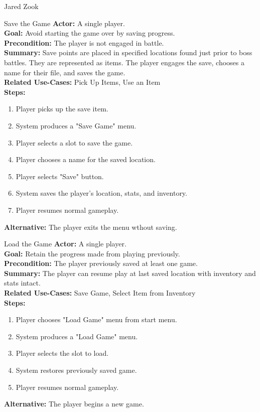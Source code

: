 \documentclass[12pt]{report}
\begin{document}
\begin{section}{Jared Zook}

\begin{subsection}{Save the Game}
\textbf{Actor:} A single player. \\
\textbf{Goal:} Avoid starting the game over by saving progress. \\
\textbf{Precondition:} The player is not engaged in battle. \\
\textbf{Summary:} Save points are placed in specified locations found just prior to boss battles. They are represented as items. The player engages the save, chooses a name for their file, and saves the game.  \\
\textbf{Related Use-Cases:} Pick Up Items, Use an Item \\
\textbf{Steps:}
\begin{enumerate}
   \item Player picks up the save item.
   \item System produces a "Save Game" menu.
   \item Player selects a slot to save the game.
   \item Player chooses a name for the saved location.
   \item Player selects "Save" button.
   \item System saves the player's location, stats, and inventory.
   \item Player resumes normal gameplay.
\end{enumerate}
\textbf{Alternative:} The player exits the menu wthout saving.
\end{subsection}

\begin{subsection}{Load the Game}
\textbf{Actor:} A single player. \\
\textbf{Goal:} Retain the progress made from playing previously. \\
\textbf{Precondition:} The player previously saved at least one game. \\
\textbf{Summary:} The player can resume play at last saved location with inventory and stats intact.  \\
\textbf{Related Use-Cases:} Save Game, Select Item from Inventory \\
\textbf{Steps:}
\begin{enumerate}
   \item Player chooses "Load Game" menu from start menu.
   \item System produces a "Load Game" menu.
   \item Player selects the slot to load.
   \item System restores previously saved game.
   \item Player resumes normal gameplay.
\end{enumerate}
\textbf{Alternative:} The player begins a new game.
\end{subsection}


\end{section}
\end{document}
